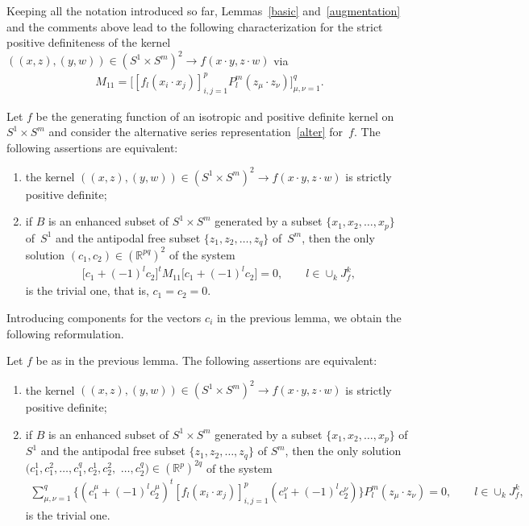 Keeping all the notation introduced so far, Lemmas~\ref{basic} and~\ref{augmentation} and the comments above lead to the following characterization for the strict positive def\/initeness of the kernel $((x,z), (y,w)) \in (S^1 \times S^m)^2 \to f(x \cdot y, z \cdot w)$ via
\begin{gather*}M_{11}=\big[ [f_l(x_i \cdot x_j) ]_{i,j=1}^p P_l^m(z_\mu \cdot z_\nu)\big]_{\mu,\nu=1}^q.\end{gather*}
\begin{Lemma}
Let $f$ be the generating function of an isotropic and positive definite kernel on~\mbox{$S^1 \times S^m$} and consider the alternative series representation~\eqref{alter} for~$f$. The following assertions are equivalent:
\begin{enumerate}\itemsep=0pt
\item[$(i)$] the kernel $((x,z), (y,w)) \in (S^1 \times S^m)^2 \to f(x \cdot y, z \cdot w)$ is strictly positive definite;
\item[$(ii)$] if $B$ is an enhanced subset of $S^1 \times S^m$ generated by a subset $\{x_1,x_2, \ldots, x_p\}$ of~$S^1$ and the antipodal free subset $\{z_1, z_2,\ldots, z_q\}$ of~$S^m$, then the only solution $(c_1, c_2) \in (\mathbb{R}^{pq})^2$ of the system
\begin{gather*}\big[c_1+(-1)^l c_2\big]^tM_{11}\big[c_1+(-1)^lc_2\big]=0,\qquad l\in \cup_{k}J_f^k,\end{gather*}
is the trivial one, that is, $c_1=c_2=0$.
\end{enumerate}
\end{Lemma}

Introducing components for the vectors $c_i$ in the previous lemma, we obtain the following reformulation.

\begin{Lemma} \label{enhanced}
Let $f$ be as in the previous lemma. The following assertions are equivalent:
\begin{enumerate}\itemsep=0pt
\item[$(i)$] the kernel $((x,z), (y,w)) \in (S^1 \times S^m)^2 \to f(x \cdot y, z \cdot w)$ is strictly positive definite;
\item[$(ii)$] if $B$ is an enhanced subset of $S^1 \times S^m$ generated by a subset $\{x_1,x_2, \ldots, x_p\}$ of $S^1$ and the antipodal free subset $\{z_1, z_2,\ldots, z_q\}$ of $S^m$, then the only solution $(c_1^1, c_1^2, \ldots, c_1^q,c_2^1, c_2^2,$ $ \ldots, c_2^q) \in (\mathbb{R}^{p})^{2q}$ of the system
\begin{gather*}\sum_{\mu,\nu=1}^q \big\{(c_1^\mu+(-1)^l c_2^\mu)^t [f_l(x_i \cdot x_j) ]_{i,j=1}^p (c_1^\nu +(-1)^l c_2^\nu)\big\} P_l^m(z_\mu \cdot z_\nu)=0,\qquad l\in \cup_{k}J_f^k,
\end{gather*}
is the trivial one.
\end{enumerate}
\end{Lemma}

